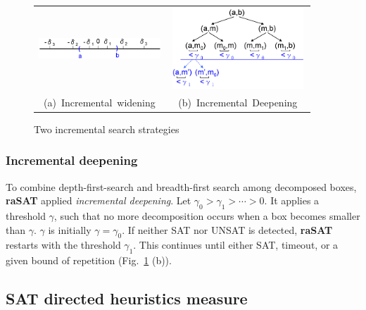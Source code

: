 \documentclass[runningheads,a4paper,oribibl]{llncs}
\newcommand{\suppress}[1]{} %
\begin{document}
\vspace{-0.7cm}

\begin{figure}[ht]
\begin{minipage}[b]{1.0\linewidth}
\centering
\begin{tabular}{c@{\qquad}c}
\includegraphics[height=0.4in,width=1.8in]{IncWiden.png} &
\includegraphics[height=1.2in,width=2in]{IncDeepen.png} \\
\mbox{(a) Incremental widening} & \mbox{(b) Incremental Deepening} \\
\end{tabular}
\caption{Two incremental search strategies}
\label{fig:incwid}
\end{minipage}
\end{figure}

\vspace{-1cm}

\subsubsection*{Incremental deepening}

To combine depth-first-search and breadth-first search among decomposed boxes,
{\bf raSAT} applied {\em incremental deepening}. 
Let $\gamma_0 > \gamma_1 > \cdots > 0$. 
It applies a threshold $\gamma$, such that no more decomposition occurs 
when a box becomes smaller than $\gamma$.
$\gamma$ is initially $\gamma=\gamma_0$. 
If neither SAT nor UNSAT is detected, {\bf raSAT} restarts with the threshold $\gamma_1$.
This continues until either SAT, timeout, or
a given bound of repetition (Fig.~\ref{fig:incwid} (b)). 


\subsection{SAT directed heuristics measure} \label{sec:SATheuristics}

\suppress{
With several hundred variables, we observe that an SMT solver works
when either SAT, or UNSAT with small UNSAT core.
%
For the latter, we need an efficient heuristics to find an UNSAT core, which is left as future work. 
For the former, the keys are how to choose variables to decompose, and 
how to choose a box to explore.
}%
\end{document}
